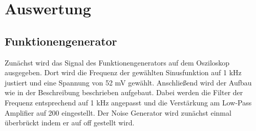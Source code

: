 \section{Auswertung}
\label{sec:Auswertung}
\subsection{Funktionengenerator}
Zunächst wird das Signal des Funktionengenerators auf dem Osziloskop ausgegeben. Dort wird die Frequenz der gewählten Sinusfunktion auf 1 kHz justiert und eine Spannung von 52 mV gewählt. Anschließend wird der Aufbau wie in der Beschreibung beschrieben aufgebaut. Dabei werden die Filter der Frequenz entsprechend auf 1 kHz angepasst und die Verstärkung am Low-Pass Amplifier auf 200 eingestellt. Der Noise Generator wird zunächst einmal überbrückt indem er auf off gestellt wird.
